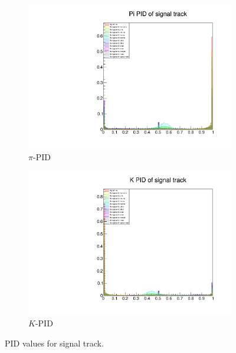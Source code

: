 \documentclass[12pt]{thesis}  %
\begin{document}
\begin{figure}
\begin{subfigure}[b]{0.475\textwidth}
            \centering 
            \includegraphics[width=\textwidth]{images/tauMG-sigPIDpi.pdf}
            \caption[]%
            {{\small $\pi$-PID}}    
            \label{fig:tauMG sigPIDpi}
        \end{subfigure}
        \hfill
        \begin{subfigure}[b]{0.475\textwidth}   
            \centering 
            \includegraphics[width=\textwidth]{images/tauMG-sigPIDk.pdf}
            \caption[]%
            {{\small $K$-PID}}    
            \label{fig:tauMG sigPIDk}
        \end{subfigure}
        \caption[]
        {\small PID values for signal track.} 
        \label{fig:tauMG sigPIDk}
    \end{figure}
\end{document}
